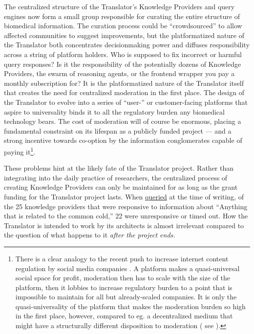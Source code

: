 The centralized structure of the Translator's Knowledge Providers and
query engines now form a small group responsible for curating the entire
structure of biomedical information. The curation process could be
``crowdsourced'' to allow affected communities to suggest improvements,
but the platformatized nature of the Translator both concentrates
decisionmaking power and diffuses responsibility across a string of
platform holders. Who is supposed to fix incorrect or harmful query
responses? Is it the responsibility of the potentially dozens of
Knowledge Providers, the swarm of reasoning agents, or the frontend
wrapper you pay a monthly subscription for? It is the platformatized
nature of the Translator itself that creates the need for centralized
moderation in the first place. The design of the Translator to evolve
into a series of ``user-'' or customer-facing platforms that aspire to
universality binds it to all the regulatory burden any biomedical
technology bears. The cost of moderation will of course be enormous,
placing a fundamental constraint on its lifespan as a publicly funded
project --- and a strong incentive towards co-option by the information
conglomerates capable of paying it\footnote{There is a clear analogy to
  the recent push to increase internet content regulation by social
  media companies \cite{doctorowRegulatingBigTech2019} . A
  platform makes a quasi-universal social space for profit, moderation
  then has to scale with the size of the platform, then it lobbies to
  increase regulatory burden to a point that is impossible to maintain
  for all but already-scaled companies. It is only the
  quasi-universality of the platform that makes the moderation burden so
  high in the first place, however, compared to eg. a decentralized
  medium that might have a structurally different disposition to
  moderation ( see \cite{rozenshteinModeratingFediverseContent2022} ).}.

These problems hint at the likely fate of the Translator project. Rather
than integrating into the daily practice of researchers, the centralized
process of creating Knowledge Providers can only be maintained for as
long as the grant funding for the Translator project lasts. When
\href{https://arax.rtx.ai}{queried} at the time of writing, of the 25
knowledge providers that were responsive to information about ``Anything
that is related to the common cold,'' 22 were unresponsive or timed out.
How the Translator is intended to work by its architects is almost
irrelevant compared to the question of what happens to it \emph{after
the project ends.}

